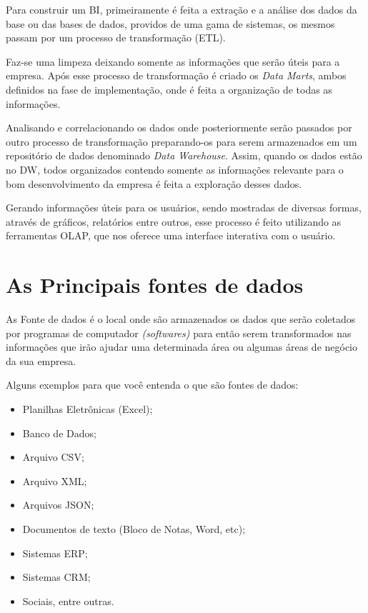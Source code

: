 Para construir um BI, primeiramente \'{e} feita a extra\c{c}\~{a}o e a an\'{a}lise dos dados da base ou das bases de dados, providos de uma gama de sistemas, os mesmos passam por um processo de transforma\c{c}\~{a}o (ETL).  

Faz-se uma limpeza deixando somente as informa\c{c}\~{o}es que ser\~{a}o úteis para a empresa. Ap\'{o}s esse processo de transforma\c{c}\~{a}o \'{e} criado os \textit{Data Marts}, ambos definidos na fase de implementa\c{c}\~{a}o, onde \'{e} feita a organiza\c{c}\~{a}o de todas as informa\c{c}\~{o}es. 

Analisando e correlacionando os dados onde posteriormente ser\~{a}o passados por outro processo de transforma\c{c}\~{a}o preparando-os para serem armazenados em um reposit\'{o}rio de dados denominado \textit{Data Warehouse}. 
Assim, quando os dados est\~{a}o no DW, todos organizados contendo somente as informa\c{c}\~{o}es relevante para o bom desenvolvimento da empresa \'{e} feita a explora\c{c}\~{a}o desses dados. 

Gerando informa\c{c}\~{o}es úteis para os usu\'{a}rios, sendo mostradas de diversas formas, atrav\'{e}s de gr\'{a}ficos, relat\'{o}rios entre outros, esse processo \'{e} feito utilizando as ferramentas OLAP, que nos oferece uma interface interativa com o usu\'{a}rio.

\section{As Principais fontes de dados}

As Fonte de dados \'{e} o local onde s\~{a}o armazenados os dados que ser\~{a}o coletados por programas de computador \textit{(softwares)} para ent\~{a}o serem transformados nas informa\c{c}\~{o}es que ir\~{a}o ajudar uma determinada \'{a}rea ou algumas \'{a}reas de neg\'{o}cio da sua empresa.

Alguns exemplos para que voc\^{e} entenda o que s\~{a}o fontes de dados:

\begin{itemize}

    \item Planilhas Eletrônicas (Excel);
    \item Banco de Dados;
    \item Arquivo CSV;
    \item Arquivo XML;
    \item Arquivos JSON;
    \item Documentos de texto (Bloco de Notas, Word, etc);
    \item Sistemas ERP;
    \item Sistemas CRM;
    \item Sociais, entre outras.
    
\end{itemize}

